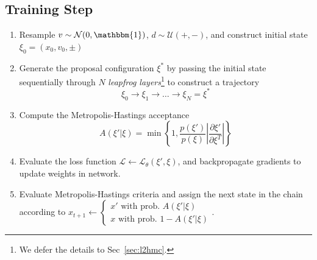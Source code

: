 \documentclass[a4paper,11pt]{article}
\begin{document}
\subsection{\label{subsec:trainstep}Training Step}
%
\begin{enumerate}
    \item Resample \(v \sim \mathcal{N} (0, \mathbbm{1})\),
        \(d \sim \mathcal{U} (+, -)\), and construct initial state
        \(\xi_{0} = (x_{0}, v_{0}, \pm)\)
    \item Generate the proposal configuration \(\xi^{\ast}\) by passing the
        initial state sequentially through \(N\) \emph{leapfrog
        layers}\footnote{
            We defer the details to Sec~\ref{sec:l2hmc}.
        } to construct a trajectory
        \begin{equation}
            \xi_{0} \rightarrow \xi_{1} \rightarrow \ldots \rightarrow%
            \xi_{N} = \xi^{\ast}
        \end{equation}
    \item Compute the Metropolis-Hastings acceptance
        \begin{equation}
            A(\xi' | \xi) = 
            \min\left\{1,
            \frac{p(\xi')}{p(\xi)}\left|\frac{\partial \xi'}{\partial \xi^{T}} \right| \right\}
            \label{eq:mhar}
        \end{equation}
    \item Evaluate the loss function \(\mathcal{L} \leftarrow
        \mathcal{L}_{\theta}(\xi', \xi)\), and backpropagate gradients to
        update weights in network.
    \item Evaluate Metropolis-Hastings criteria and assign the next state in
        the chain according to \(
        x_{t+1} \leftarrow \begin{cases} 
            x' \text{ with prob. } A(\xi'|\xi) \\ 
            x \text{ with prob. } 1 - A(\xi'|\xi)
        \end{cases}\).
\end{enumerate}
%
%




\end{document}
